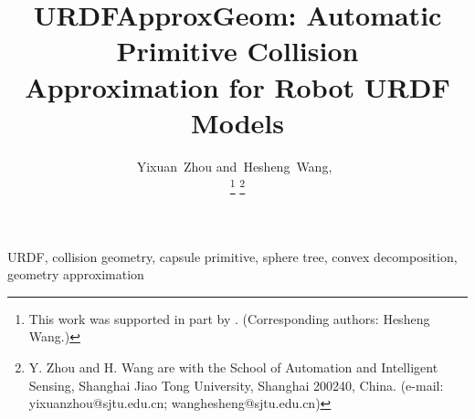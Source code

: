 \documentclass[journal]{IEEEtran}
\title{URDFApproxGeom: Automatic Primitive Collision\\Approximation for Robot URDF Models}
\author{
  Yixuan~Zhou
  and~Hesheng~Wang,~\IEEEmembership{Senior~Member,~IEEE}

  \thanks{This work was supported in part by \todo{funding info}. (Corresponding authors: Hesheng Wang.)}
  \thanks{Y. Zhou and H. Wang are with the School of Automation and Intelligent Sensing, Shanghai Jiao Tong University, Shanghai 200240, China. (e-mail: yixuanzhou@sjtu.edu.cn; wanghesheng@sjtu.edu.cn)}
}
\begin{document}
\maketitle

\begin{abstract}

\end{abstract}

\begin{IEEEkeywords}
URDF, collision geometry, capsule primitive, sphere tree, convex decomposition, geometry approximation
\end{IEEEkeywords}












\end{document}
